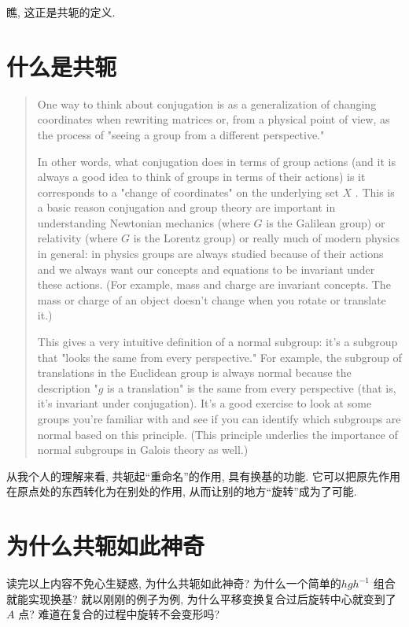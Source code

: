 \documentclass{article}
\begin{document}
瞧, 这正是共轭的定义.

\section{什么是共轭}

\begin{quotation}
    One way to think about conjugation is as a
    generalization of changing coordinates when rewriting
    matrices or, from a physical point of view, as the
    process of "seeing a group from a different perspective."

    In other words, what conjugation does in terms of group
    actions (and it is always a good idea to think of groups in
    terms of their actions) is it corresponds to a "change of
    coordinates" on the underlying set \(X\)
    . This is a basic reason conjugation and group theory are
    important in understanding Newtonian mechanics (where \(G\)
    is the Galilean group) or relativity (where \(G\)
    is the Lorentz group) or really much of modern physics in
    general: in physics groups are always studied because of
    their actions and we always want our concepts and equations
    to be invariant under these actions. (For example, mass and
        charge are invariant concepts. The mass or charge of an
    object doesn't change when you rotate or translate it.)

    This gives a very intuitive definition of a normal
    subgroup: it's a subgroup that "looks the same from every
    perspective." For example, the subgroup of translations in
    the Euclidean group is always normal because the
    description "\(g\)
    is a translation" is the same from every perspective (that
    is, it's invariant under conjugation). It's a good exercise
    to look at some groups you're familiar with and see if you
    can identify which subgroups are normal based on this
    principle. (This principle underlies the importance of
    normal subgroups in Galois theory as well.)
\end{quotation}

从我个人的理解来看, 共轭起``重命名''的作用, 具有换基的功能.
它可以把原先作用在原点处的东西转化为在别处的作用, 从而让别的地方``旋转''成为了可能.

\section{为什么共轭如此神奇}
读完以上内容不免心生疑惑, 为什么共轭如此神奇? 为什么一个简单的\(hgh^{-1}\) 组合就能实现换基?
就以刚刚的例子为例, 为什么平移变换复合过后旋转中心就变到了\(A\) 点? 难道在复合的过程中旋转不会变形吗?
\end{document}

